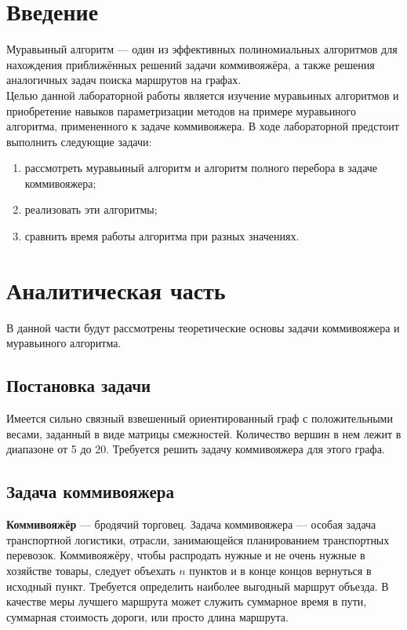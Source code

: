 \documentclass[a4paper, 12pt]{article}
\begin{document}
\tableofcontents
\clearpage
\newpage

\section*{Введение}


	\hspace*{5mm} Муравьиный алгоритм — один из эффективных полиномиальных алгоритмов для нахождения приближённых решений задачи коммивояжёра, а также решения аналогичных задач поиска маршрутов на графах.
	\\ \hspace*{5mm}Целью данной лабораторной работы является изучение муравьиных алгоритмов и приобретение навыков параметризации методов на примере муравьиного алгоритма, примененного к задаче коммивояжера. 
	\newline В ходе лабораторной предстоит выполнить следующие задачи: 
	\begin{enumerate}
		\item рассмотреть муравьиный алгоритм и алгоритм полного перебора в задаче коммивояжера;
		\item реализовать эти алгоритмы;
		\item сравнить время работы алгоритма при разных значениях.
	\end{enumerate}
	

\clearpage
\newpage
\section{Аналитическая часть}

	\hspace*{5mm} В данной части будут рассмотрены теоретические основы задачи коммивояжера и муравьиного алгоритма.
	\subsection{Постановка задачи}
	\hspace*{5mm} Имеется сильно связный взвешенный ориентированный граф с положительными весами, заданный в виде матрицы смежностей. Количество вершин в нем лежит в диапазоне от 5 до 20. Требуется решить задачу коммивояжера для этого графа. 

	\subsection{Задача коммивояжера}
	\hspace*{5mm} \textbf{Коммивояжёр} — бродячий торговец. Задача коммивояжера — особая задача транспортной логистики, отрасли, занимающейся планированием транспортных перевозок. Коммивояжёру, чтобы распродать нужные и не очень нужные в хозяйстве товары, следует объехать $n$ пунктов и в конце концов вернуться в исходный пункт. Требуется определить наиболее выгодный маршрут объезда. В качестве меры лучшего маршрута может служить суммарное время в пути, суммарная стоимость дороги, или просто длина маршрута.\cite{commi2}
\end{document}
